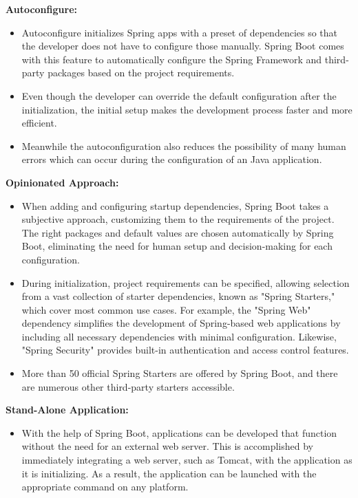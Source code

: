     \textbf{Autoconfigure:}
        \begin{itemize}
            \item Autoconfigure initializes Spring apps with a preset of dependencies so that the developer does not have to configure those manually. Spring Boot comes with this feature to automatically configure the Spring Framework and third-party packages based on the project requirements.
            \item Even though the developer can override the default configuration after the initialization, the initial setup makes the development process faster and more efficient.
            \item Meanwhile the autoconfiguration also reduces the possibility of many human errors which can occur during the configuration of an Java application.
        \end{itemize}
    \textbf{Opinionated Approach:}
        \begin{itemize}
            \item When adding and configuring startup dependencies, Spring Boot takes a subjective approach, customizing them to the requirements of the project. The right packages and default values are chosen automatically by Spring Boot, eliminating the need for human setup and decision-making for each configuration.

            \item During initialization, project requirements can be specified, allowing selection from a vast collection of starter dependencies, known as "Spring Starters," which cover most common use cases. For example, the "Spring Web" dependency simplifies the development of Spring-based web applications by including all necessary dependencies with minimal configuration. Likewise, "Spring Security" provides built-in authentication and access control features. 

            \item More than 50 official Spring Starters are offered by Spring Boot, and there are numerous other third-party starters accessible.


        \end{itemize}
    \textbf{Stand-Alone Application:}
        \begin{itemize}
            \item With the help of Spring Boot, applications can be developed that function without the need for an external web server. This is accomplished by immediately integrating a web server, such as Tomcat, with the application as it is initializing. As a result, the application can be launched with the appropriate command on any platform.
        \end{itemize}                
    
